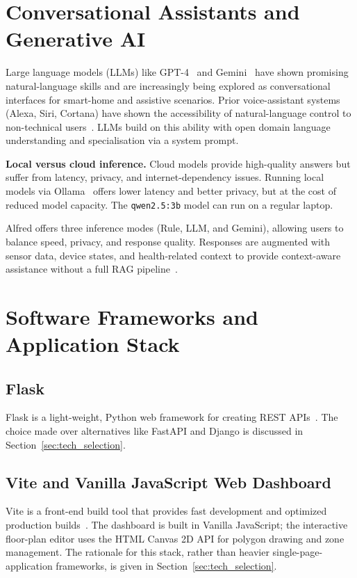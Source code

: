 \section{Conversational Assistants and Generative AI}

Large language models (LLMs) like GPT-4~\cite{OpenAI2023} and Gemini~\cite{Gemini2024} have shown promising natural-language skills and are increasingly being explored as conversational interfaces for smart-home and assistive scenarios. Prior voice-assistant systems (Alexa, Siri, Cortana) have shown the accessibility of natural-language control to non-technical users~\cite{Hoy2018}. LLMs build on this ability with open domain language understanding and specialisation via a system prompt.

\textbf{Local versus cloud inference.} Cloud models provide high-quality answers but suffer from latency, privacy, and internet-dependency issues. Running local models via Ollama~\cite{Ollama2023} offers lower latency and better privacy, but at the cost of reduced model capacity. The \texttt{qwen2.5:3b} model can run on a regular laptop.

Alfred offers three inference modes (Rule, LLM, and Gemini), allowing users to balance speed, privacy, and response quality. Responses are augmented with sensor data, device states, and health-related context to provide context-aware assistance without a full RAG pipeline~\cite{Momand2025}.

\section{Software Frameworks and Application Stack}
\label{sec:software_arch}

\subsection{Flask}

Flask is a light-weight, Python web framework for creating REST APIs~\cite{Ronacher2010}. The choice made over alternatives like FastAPI and Django is discussed in Section~\ref{sec:tech_selection}.

\subsection{Vite and Vanilla JavaScript Web Dashboard}

Vite is a front-end build tool that provides fast development and optimized production builds~\cite{Vite2024}. The dashboard is built in Vanilla JavaScript; the interactive floor-plan editor uses the HTML Canvas 2D API for polygon drawing and zone management. The rationale for this stack, rather than heavier single-page-application frameworks, is given in Section~\ref{sec:tech_selection}.

